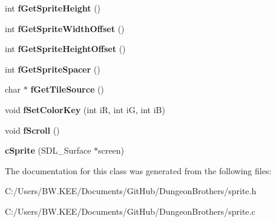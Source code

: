 \begin{DoxyCompactItemize}
\item 
\hypertarget{classc_sprite_a03228f1a93a795392d83f433e243ff07}{int {\bfseries f\-Get\-Sprite\-Height} ()}\label{classc_sprite_a03228f1a93a795392d83f433e243ff07}

\item 
\hypertarget{classc_sprite_abb0ae63b1039d3caccdff9eafe6dd282}{int {\bfseries f\-Get\-Sprite\-Width\-Offset} ()}\label{classc_sprite_abb0ae63b1039d3caccdff9eafe6dd282}

\item 
\hypertarget{classc_sprite_ab710b29658c751f2988368d438b6f27f}{int {\bfseries f\-Get\-Sprite\-Height\-Offset} ()}\label{classc_sprite_ab710b29658c751f2988368d438b6f27f}

\item 
\hypertarget{classc_sprite_a406a292a0b156ddc716c3f6a4ac62f12}{int {\bfseries f\-Get\-Sprite\-Spacer} ()}\label{classc_sprite_a406a292a0b156ddc716c3f6a4ac62f12}

\item 
\hypertarget{classc_sprite_a81cab547630d110e9015cf2f85918e51}{char $\ast$ {\bfseries f\-Get\-Tile\-Source} ()}\label{classc_sprite_a81cab547630d110e9015cf2f85918e51}

\item 
\hypertarget{classc_sprite_a200e49fcedb589fa54139dc9cbd2f07e}{void {\bfseries f\-Set\-Color\-Key} (int i\-R, int i\-G, int i\-B)}\label{classc_sprite_a200e49fcedb589fa54139dc9cbd2f07e}

\item 
\hypertarget{classc_sprite_a88cb2a43a5653ef449ee5f3974307dfc}{void {\bfseries f\-Scroll} ()}\label{classc_sprite_a88cb2a43a5653ef449ee5f3974307dfc}

\item 
\hypertarget{classc_sprite_abeebe92ab7bef34feec37b26f3ecd0a2}{{\bfseries c\-Sprite} (S\-D\-L\-\_\-\-Surface $\ast$screen)}\label{classc_sprite_abeebe92ab7bef34feec37b26f3ecd0a2}

\end{DoxyCompactItemize}


The documentation for this class was generated from the following files\-:\begin{DoxyCompactItemize}
\item 
C\-:/\-Users/\-B\-W.\-K\-E\-E/\-Documents/\-Git\-Hub/\-Dungeon\-Brothers/sprite.\-h\item 
C\-:/\-Users/\-B\-W.\-K\-E\-E/\-Documents/\-Git\-Hub/\-Dungeon\-Brothers/sprite.\-c\end{DoxyCompactItemize}
